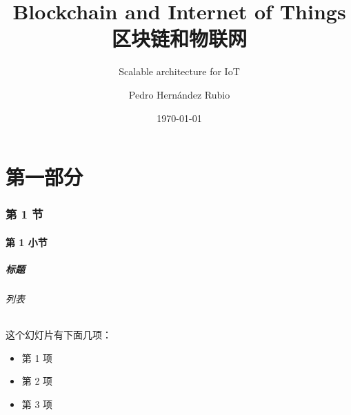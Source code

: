 \documentclass[
    aspectratio=169,                   %
]{beamer}
\begin{document}
    \title{Blockchain and Internet of Things 区块链和物联网}  %
    \subtitle{Scalable architecture for IoT}         %
    \author{Pedro Hernández Rubio}                  %
    \date{\today}                          %
    \maketitle                             %

\part{第一部分}

\AtBeginSection[]{
    \begin{frame}
        \sectionpage                   %
    \end{frame}
}

\AtBeginSubsection[]{                  %
    \begin{frame}
        \subsectionpage                %
    \end{frame}
}

\section{第 1 节}
\subsection{第 1 小节}

    \begin{frame}
        \frametitle{标题}

        \paragraph{列表} 这个\alert{幻灯片}有下面几项：

        \begin{itemize}
            \item 第 1 项
            \item 第 2 项
            \item 第 3 项
        \end{itemize}

    \end{frame}
\end{document}
